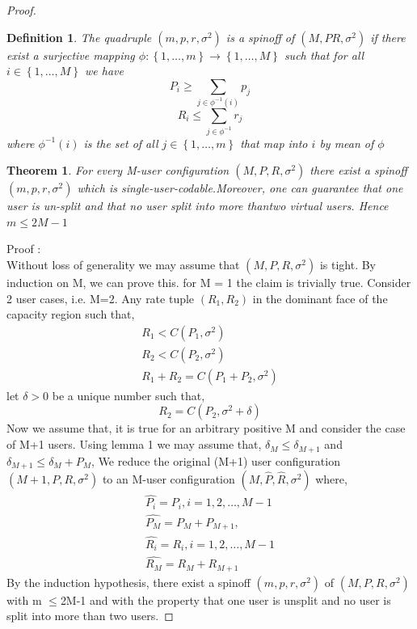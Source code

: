\documentclass{article}
\newtheorem{theorem}{Theorem}
\newtheorem{definition}{Definition}
\begin{document}
\begin{proof}
	\begin{definition}
		The quadruple $\left(m,p,r, \sigma^2 \right)$ is a spinoff of $\left(M, P R, \sigma^2 \right)$ if there exist a surjective mapping $\phi : \left\{ 1, \dots , m\right\} \rightarrow \left\{ 1, \dots, M\right\}$ such that for all $ i \in \left\{ 1, \dots, M \right\}$ we have 
		\begin{equation}
			P_i \geq \sum_{j \in \phi^{-1}(i)} p_j
		\end{equation} 
\begin{equation}
	R_i \leq \sum_{j \in \phi^{-1} }r_j
\end{equation}
where $\phi^{-1}(i)$ is the set of all $j \in \left\{ 1, \dots, m\right\}$ that map into $i$ by mean of $\phi$
	\end{definition}
\begin{theorem}
	For every M-user configuration $\left(M, P, R, \sigma^2 \right)$ there exist a spinoff $\left( m,p,r, \sigma^2\right)$ which is single-user-codable.Moreover, one can guarantee that one user is un-split and that no user split into more thantwo virtual users. Hence $m\leq 2M-1$
\end{theorem}

Proof :\\
Without loss of generality we may assume that $\left(M,P,R,\sigma^2\right)$ is tight. By induction on M, we can prove this. for M = 1 the claim is trivially true. Consider 2 user cases, i.e. M=2. Any rate tuple $(R_1, R_2)$ in the dominant face of the capacity region such that,
	\begin{align*}
		R_1< C(P_1, \sigma^2)\\
		R_2 < C(P_2, \sigma^2) \\
		R_1+ R_2 = C(P_1 +P_2 , \sigma^2)
	\end{align*}
	let $\delta >0 $ be a unique number such that,
	\begin{equation}
		R_2 = C(P_2 , \sigma^2 + \delta)
	\end{equation}
Now we assume that, it is true for an arbitrary positive M and consider the case of M+1 users. Using lemma 1 we may assume that,
$\delta_M \leq \delta_{M+1}$ and $\delta_{M+1}\leq \delta_M +P_M$, We reduce the original (M+1) user configuration $\left(M+1, P,R, \sigma^2\right)$ to an M-user configuration $\left(M,\hat{P}, \hat{R}, \sigma^2\right)$ where,\\
\begin{align*}	
	\hat{P_i} = P_i, i = 1,2, \dots, M-1\\
	\hat{P_M} = P_M + P_{M+1},\\   \hat{R_i} = R_i,   i = 1,2, \dots, M-1 \\  \hat{R_M} = R_M + R_{M+1}
\end{align*}
By the induction hypothesis, there exist a spinoff $\left(m,p, r, \sigma^2 \right)$ of $\left(M, P, R,\sigma^2 \right)$ with m $\leq$2M-1 and with the property that one user is unsplit and no user is split into more than two users.


\end{proof}
\end{document}
